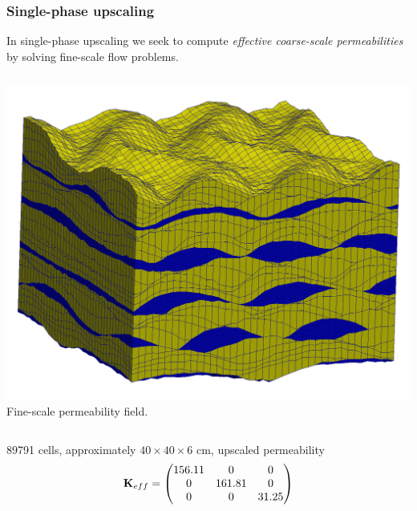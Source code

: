 \documentclass[UKenglish,10pt]{beamer}
\def\bfK{{\bf K}}
\begin{document}
\begin{frame}
  \frametitle{Single-phase upscaling}
  In single-phase upscaling we seek to compute \emph{effective
    coarse-scale permeabilities} by solving fine-scale flow problems.

  \begin{columns}[c]
    \includegraphics[width=\textwidth]{figs/wave_orig}
    Fine-scale permeability field.
  \end{columns}
  89791 cells, approximately $40 \times 40 \times 6$ cm, upscaled permeability
  \[
  \bfK_{eff} = 
  \begin{pmatrix}
    156.11 & 0 & 0 \\ 
    0 & 161.81 & 0 \\
    0 & 0 & 31.25 \\
  \end{pmatrix}
  \]
\end{frame}
\end{document}
